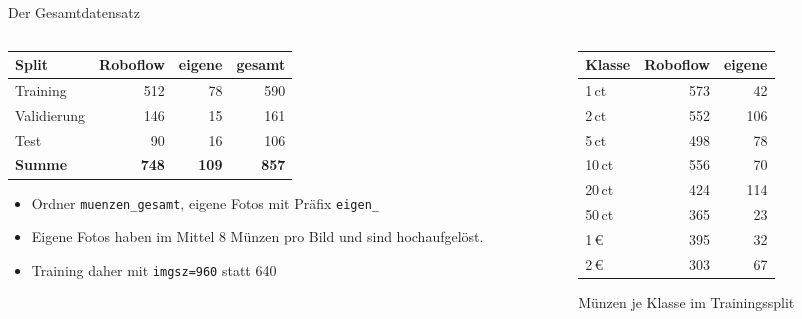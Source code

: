 \begin{frame}{Der Gesamtdatensatz}
\footnotesize
\begin{columns}
\begin{column}{0.47\textwidth}
\centering
\begin{tabular}{lrrr}
\toprule
\textbf{Split} & \textbf{Roboflow} & \textbf{eigene} & \textbf{gesamt} \\
\midrule
Training & 512 & 78 & 590 \\
Validierung & 146 & 15 & 161 \\
Test & 90 & 16 & 106 \\
\midrule
\textbf{Summe} & \textbf{748} & \textbf{109} & \textbf{857} \\
\bottomrule
\end{tabular}

\vspace{0.6em}
\begin{itemize}
  \item Ordner \texttt{muenzen\_gesamt}, eigene Fotos mit Präfix \texttt{eigen\_}
  \item Eigene Fotos haben im Mittel 8 Münzen pro Bild und sind hochaufgelöst.
  \item Training daher mit \texttt{imgsz=960} statt 640
\end{itemize}
\end{column}
\begin{column}{0.48\textwidth}
\centering
\begin{tabular}{lrr}
\toprule
\textbf{Klasse} & \textbf{Roboflow} & \textbf{eigene} \\
\midrule
1\,ct  & 573 & 42 \\
2\,ct  & 552 & 106 \\
5\,ct  & 498 & 78 \\
10\,ct & 556 & 70 \\
20\,ct & 424 & 114 \\
50\,ct & 365 & 23 \\
1\,€   & 395 & 32 \\
2\,€   & 303 & 67 \\
\bottomrule
\end{tabular}

\vspace{0.4em}
\scriptsize Münzen je Klasse im Trainingssplit
\end{column}
\end{columns}
\end{frame}

